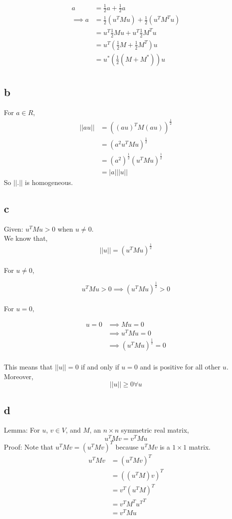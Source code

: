 \documentclass[11pt]{amsart}
\begin{document}
\begin{align*}
a &= \frac{1}{2}a + \frac{1}{2}a\\
\implies a &= \frac{1}{2}(u^TMu) + \frac{1}{2}(u^TM^Tu)\\
&= u^T\frac{1}{2}Mu + u^T\frac{1}{2}M^Tu\\
& = u^T(\frac{1}{2}M + \frac{1}{2}M^T)u\\ 
&= u^*(\frac{1}{2}(M+M^*))u\\
\end{align*}

\subsection*{b}
For $a \in R$,
\begin{align*}
||au|| &= ((au)^TM(au))^\frac{1}{2}\\
&= (a^2 u^TMu)^\frac{1}{2}\\
&= (a^2)^\frac{1}{2}(u^TMu)^\frac{1}{2}\\
&= |a|||u||
\end{align*}
So $||.||$ is homogeneous.

\subsection*{c}
Given: $u^TMu > 0$ when $u\neq 0$.
\\We know that,
\[
||u|| = (u^TMu)^\frac{1}{2}
\]
\\For $u \neq 0$, 

\[u^TMu > 0 \implies (u^TMu)^\frac{1}{2} > 0\]
\\For $u = 0, $

\begin{align*}u = 0 &\implies Mu = 0\\ &\implies u^TMu = 0\\ &\implies (u^TMu)^\frac{1}{2} = 0\end{align*}
\\This means that $||u|| = 0$ if and only if $u = 0$ and is positive for all other $u$. Moreover, 
\[
||u|| \ge 0 \forall u
\]

\subsection*{d}
Lemma: For $u$, $v \in V$, and $M$, an $n \times n$ symmetric real matrix,
\[
u^TMv = v^TMu
\]
Proof: Note that $u^TMv = (u^TMv)^T$ because $u^TMv$ is a $1\times1$ matrix.
\begin{align*}
u^TMv &= (u^TMv)^T\\
&= ((u^TM)v)^T\\
&= v^T(u^TM)^T\\
&= v^TM^T{u^T}^T\\
&= v^TMu
\end{align*}
\end{document}
